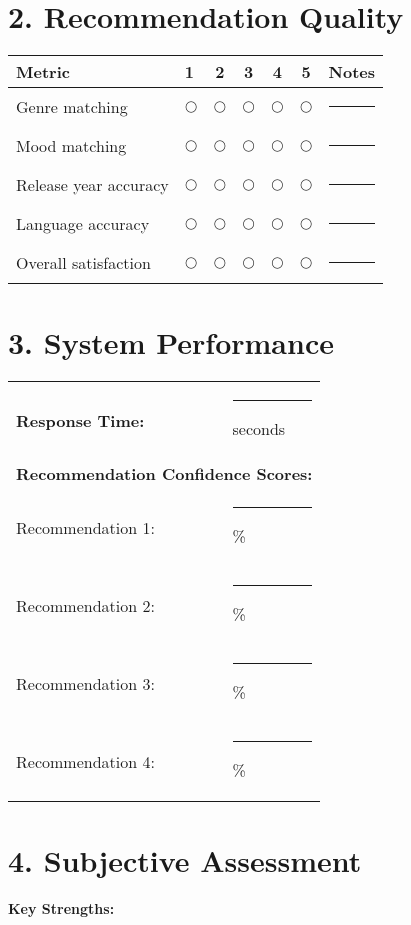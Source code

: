 \documentclass[11pt]{article}
\begin{document}
  \section*{2. Recommendation Quality}
  \begin{center}
    \begin{tabular}{p{5cm}lccccl}
        \textbf{Metric} & \textbf{1} & \textbf{2} & \textbf{3} & \textbf{4} & \textbf{5} & \textbf{Notes}\\
        \toprule
        Genre matching & $\bigcirc$ & $\bigcirc$ & $\bigcirc$ & $\bigcirc$ & $\bigcirc$ & \rule{6cm}{0.15mm}\\
        Mood matching & $\bigcirc$ & $\bigcirc$ & $\bigcirc$ & $\bigcirc$ & $\bigcirc$ & \rule{6cm}{0.15mm}\\
        Release year accuracy & $\bigcirc$ & $\bigcirc$ & $\bigcirc$ & $\bigcirc$ & $\bigcirc$ & \rule{6cm}{0.15mm}\\
        Language accuracy & $\bigcirc$ & $\bigcirc$ & $\bigcirc$ & $\bigcirc$ & $\bigcirc$ & \rule{6cm}{0.15mm}\\
        Overall satisfaction & $\bigcirc$ & $\bigcirc$ & $\bigcirc$ & $\bigcirc$ & $\bigcirc$ & \rule{6cm}{0.15mm}\\
    \end{tabular}
  \end{center}

  \section*{3. System Performance}
  \begin{tabular}{lp{5cm}}
      \textbf{Response Time:} & \rule{2cm}{0.15mm} seconds \\[0.5cm]

      \multicolumn{2}{l}{\textbf{Recommendation Confidence Scores:}} \\[0.2cm]
      Recommendation 1: & \rule{2cm}{0.15mm}\% \\
      Recommendation 2: & \rule{2cm}{0.15mm}\% \\
      Recommendation 3: & \rule{2cm}{0.15mm}\% \\
      Recommendation 4: & \rule{2cm}{0.15mm}\%
  \end{tabular}

  \section*{4. Subjective Assessment}
  \textbf{Key Strengths:}
  \vspace{2cm}
\end{document}
